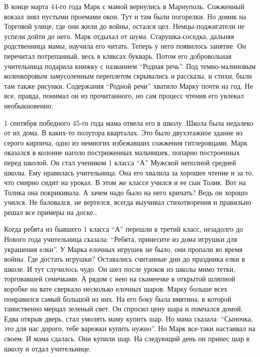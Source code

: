В конце марта 44-го года Марк с мамой вернулись в Мариуполь. Сожженный вокзал
зиял пустыми проемами окон. Тут и там были погорелки. Но домик на Торговой
улице, где они жили до войны, остался цел. Немцы-поджигатели не успели дойти до
него. Марк отдыхал от шума. Старушка-соседка, дальняя родственница мамы,
научила его читать. Теперь у него появилось занятие. Он перечитал потрепанный,
весь в кляксах букварь. Потом его добровольная учительница подарила книжку с
названием \enquote{Родная речь}. Под темно-малиновым коленкоровым замусоленным
переплетом скрывались и рассказы, и стихи, были там также рисунки. Содержания
\enquote{Родной речи} хватило Марку почти на год. Не все, правда, понимал он из
прочитанного, но сам процесс чтения его увлекал необыкновенно.

1 сентября победного 45-го года мама отвела его в школу. Школа была недалеко от
их дома. В каких-то полутора кварталах. Это было двухэтажное здание из серого
кирпича, одно из немногих избежавших сожжения гитлеровцами. Марк оказался в
колонне наголо постриженных мальчишек, попарно построенных перед школой. Он
стал учеником 1 класса \enquote{А} Мужской неполной средней школы. Ему нравилась
учительница. Она его хвалила за хорошее чтение и за то, что смирно сидит на
уроках. В этом же классе учился и ее сын Толик. Вот на Толика она покрикивала.
А зачем надо было на него кричать? Ведь он хорошо учился. Не баловался, не
вертелся, всегда выучивал стихотворения и правильно решал все примеры на доске…

Когда ребята из бывшего 1 класса \enquote{А} перешли в третий класс, незадолго до
Нового года учительница сказала: \enquote{Ребята, принесите из дома игрушки для
украшения елки}. У Марка елочных игрушек не было, они пропали во время войны.
Где достать игрушки? Оставались считанные дни до праздника елки в школе. И тут
случилось чудо. Он шел после уроков из школы мимо тетки, торговавшей семечками.
А рядом с нею на скамеечке в открытой шляпной коробке на вате сверкало
несколько елочных шаров. Марку больше всех понравился самый большой из них. На
его боку была вмятина, в которой таинственно мерцал зеленый свет. Он спросил
цену шара и помчался домой. Едва открыв дверь, стал умолять маму купить шар. Но
мама сказала: \enquote{Сыночка, это для нас дорого, тебе варежки купить нужно}. Но Марк
все-таки настаивал на своем. И мама сдалась. Они купили шар. На следующий день
он принес шар в школу и отдал учительнице.

